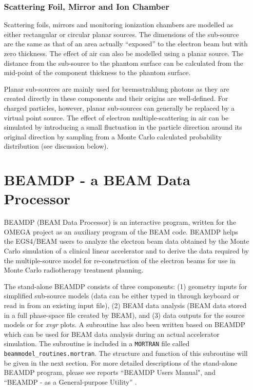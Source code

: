 \documentclass[12pt,twoside]{article}
\begin{document}
\subsubsection{Scattering Foil, Mirror and Ion Chamber}

Scattering foils, mirrors and monitoring ionization chambers are modelled as either rectangular or circular planar sources. The dimensions of the sub-source are the same as that of an area actually ``exposed'' to the electron beam but with zero thickness. The effect of air can also be modelled using a planar source. The distance from the sub-source to the phantom surface can be calculated from the mid-point of the component thickness to the phantom surface.

Planar sub-sources are mainly used for bremsstrahlung photons as they are created directly in these components and their origins are well-defined. For charged particles, however, planar sub-sources can generally be replaced by a virtual point source. The effect of electron multiple-scattering in air can be simulated by introducing a small fluctuation in the particle direction around its original direction by sampling from a Monte Carlo calculated probability distribution (see discussion below).

\section{BEAMDP - a BEAM Data Processor}

BEAMDP (BEAM Data Processor) is an interactive program, written for the
OMEGA project as an auxiliary program of the BEAM code. BEAMDP helps the
EGS4/BEAM \cite{Ro95} users to analyze the electron beam data obtained by the
Monte Carlo simulation of  a clinical linear accelerator and to derive the
data required by the multiple-source model for re-construction of the
electron beams for use in Monte Carlo radiotherapy treatment planning.

The stand-alone BEAMDP consists of three components: (1) geometry inputs
for simplified sub-source models (data can be either typed in through
keyboard or read in from an existing input file), (2) BEAM data analysis
(BEAM data stored in a full phase-space file created by BEAM), and (3)
data outputs for the source models or for {\it xvgr} plots. A subroutine
has also been written based on BEAMDP which can be used for BEAM data
analysis during an actual accelerator simulation. The subroutine is
included in a {\tt MORTRAN} file called {\tt beammodel\_routines.mortran}.
The structure and function of this subroutine will be given in the next
section. For more detailed descriptions of the stand-alone BEAMDP program,
please see reports ``BEAMDP Users Manual"\cite{MR95a}, and ``BEAMDP - as a
General-purpose Utility'' \cite{MR95b}.
\end{document}
